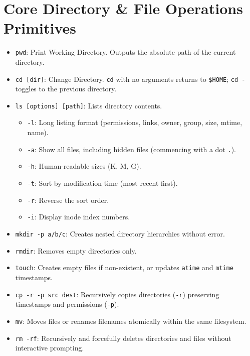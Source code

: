\section{Core Directory \& File Operations Primitives}
\begin{itemize}[leftmargin=1.5em]
    \item \texttt{pwd}: Print Working Directory. Outputs the absolute path of the current directory.
    \item \texttt{cd [dir]}: Change Directory. \texttt{cd} with no arguments returns to \texttt{\$HOME}; \texttt{cd -} toggles to the previous directory.
    \item \texttt{ls [options] [path]}: Lists directory contents.
    \begin{itemize}
        \item \texttt{-l}: Long listing format (permissions, links, owner, group, size, mtime, name).
        \item \texttt{-a}: Show all files, including hidden files (commencing with a dot \texttt{.}).
        \item \texttt{-h}: Human-readable sizes (K, M, G).
        \item \texttt{-t}: Sort by modification time (most recent first).
        \item \texttt{-r}: Reverse the sort order.
        \item \texttt{-i}: Display inode index numbers.
    \end{itemize}
    \item \texttt{mkdir -p a/b/c}: Creates nested directory hierarchies without error.
    \item \texttt{rmdir}: Removes empty directories only.
    \item \texttt{touch}: Creates empty files if non-existent, or updates \texttt{atime} and \texttt{mtime} timestamps.
    \item \texttt{cp -r -p src dest}: Recursively copies directories (\texttt{-r}) preserving timestamps and permissions (\texttt{-p}).
    \item \texttt{mv}: Moves files or renames filenames atomically within the same filesystem.
    \item \texttt{rm -rf}: Recursively and forcefully deletes directories and files without interactive prompting.
\end{itemize}

